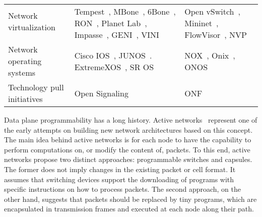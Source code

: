 {\begin{table*}[!htp]
\begin{center}
\begin{tabularx}{\linewidth}{p{\fcwidth}p{\scwidth}p{\tcwidth}}
{\begin{minipage}{\fcwidth}
		Network virtualization
	\end{minipage}} 
& \multirow{2}{*}{\begin{minipage}{\scwidth}
		Tempest~\cite{merwe1998},
		MBone~\cite{macedonia1994},
		6Bone~\cite{fink2004},
		RON~\cite{andersen2001},
		Planet Lab~\cite{chun2003},
		Impasse~\cite{anderson2005},
		GENI~\cite{peterson2006},
		VINI~\cite{bavier2006-1}
	\end{minipage}} 
& \multirow{2}{*}{
	\begin{minipage}{\tcwidth}
		Open vSwitch~\cite{pfaff2009},
		Mininet~\cite{lantz2010},
		FlowVisor~\cite{sherwood2010},
		NVP~\cite{koponen}
	\end{minipage}} \\
& & \\
\hline
\multirow{1}{*}{\begin{minipage}{\fcwidth}
		Network operating systems
	\end{minipage}} 
& \multirow{1}{*}{\begin{minipage}{\scwidth}
		Cisco IOS~\cite{bollapragada2000},
		JUNOS~\cite{junipernetworks2012}.
		ExtremeXOS~\cite{extremenetworks2014},
		SR OS~\cite{alcatellucent2014}
	\end{minipage}} 
& \multirow{1}{*}{
	\begin{minipage}{\tcwidth}
		NOX~\cite{gude2008},
		Onix~\cite{koponen-1},
		ONOS~\cite{krishnaswamy2013}
	\end{minipage}} \\
\hline
\multirow{1}{*}{\begin{minipage}{\fcwidth}
		Technology pull initiatives
	\end{minipage}} 
& \multirow{1}{*}{\begin{minipage}{\scwidth}
	Open Signaling~\cite{campbell1999}
	\end{minipage}} 
& \multirow{1}{*}{
	\begin{minipage}{\tcwidth}
	ONF~\cite{onf2013-3}
	\end{minipage}} \\
\hline
\end{tabularx}
\end{center}
\end{table*}
}

Data plane programmability has a long history. Active networks~\cite{tennenhouse1997} 
represent one of the early attempts on building new network architectures based on this concept.
The main idea behind active networks is for each node to have the capability to perform computations 
on, or modify the content of, packets. To this end, active networks propose two distinct approaches: 
programmable switches and capsules. The former does not imply changes in the existing packet or cell 
format. It assumes that switching devices support the downloading of programs with specific instructions 
on how to process packets. The second approach, on the other hand, suggests that packets should be 
replaced by tiny programs, which are encapsulated in transmission frames and executed at each node 
along their path.

